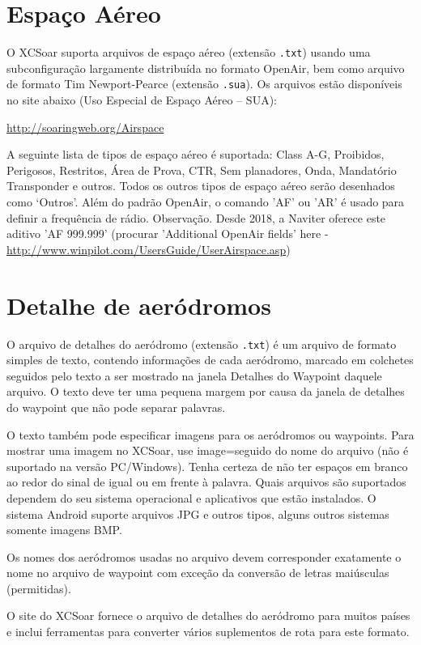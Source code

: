 \section{Espaço Aéreo}

O XCSoar suporta arquivos de espaço aéreo (extensão \verb|.txt|) usando uma subconfiguração largamente distribuída no formato OpenAir, bem como arquivo de formato Tim Newport-Pearce  (extensão \verb|.sua|). Os arquivos estão disponíveis no site abaixo (Uso Especial de Espaço Aéreo – SUA):

\url{http://soaringweb.org/Airspace}

A seguinte lista de tipos de espaço aéreo é suportada: Class A-G, Proibidos, Perigosos, Restritos, Área de Prova, CTR, Sem planadores, Onda, Mandatório Transponder e outros.  Todos os outros tipos de espaço aéreo serão desenhados como ‘Outros’.
Além do padrão OpenAir, o comando 'AF' ou 'AR' é usado para definir a frequência de rádio.
Observação. Desde 2018, a Naviter oferece este aditivo 'AF 999.999' (procurar 'Additional OpenAir fields' here - \url{http://www.winpilot.com/UsersGuide/UserAirspace.asp})

\section{Detalhe de aeródromos}\label{sec:airfield-details}

O arquivo de detalhes do aeródromo (extensão \verb|.txt|) é um arquivo de formato simples de texto, contendo informações de cada aeródromo, marcado em colchetes seguidos pelo texto a ser mostrado na janela Detalhes do Waypoint daquele arquivo.  O texto deve ter uma pequena margem por causa da janela de detalhes do waypoint que não pode separar palavras.

O texto também pode especificar imagens para os aeródromos ou waypoints.  Para mostrar uma imagem no XCSoar, use image=seguido do nome do arquivo (não é suportado na versão PC/Windows).  Tenha certeza de não ter espaços em branco ao redor do sinal de igual ou em frente à palavra.  Quais arquivos são suportados dependem do seu sistema operacional e aplicativos que estão instalados.  O sistema Android suporte arquivos JPG e outros tipos, alguns outros sistemas somente imagens BMP.

Os nomes dos aeródromos usadas no arquivo devem corresponder exatamente o nome no arquivo de waypoint com exceção da conversão de letras maiúsculas (permitidas).

O site do XCSoar fornece o arquivo de detalhes do aeródromo para muitos países e inclui ferramentas para converter vários suplementos de rota para este formato.


